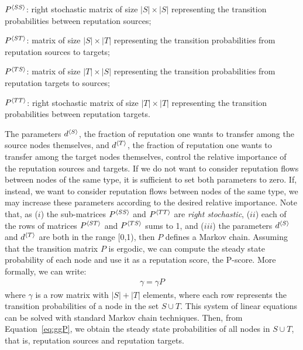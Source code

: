 \documentclass[notitlepage]{svjour3}
\begin{document}
\begin{description}
\item $P{^{\langle SS \rangle}}$: right stochastic matrix of size $|S|\times |S|$ representing the 
transition probabilities between reputation sources;
\item $P{^{\langle ST \rangle}}$: matrix of size $|S|\times |T|$ representing the transition probabilities from reputation sources to targets;
\item $P{^{\langle TS \rangle}}$: matrix of size $|T|\times |S|$ representing the transition probabilities from reputation targets to sources;
\item $P{^{\langle TT \rangle}}$: right stochastic matrix of size $|T|\times |T|$ representing the transition probabilities between reputation targets.
\end{description}

The parameters $d{^{\langle S \rangle}}$, the fraction of reputation one wants to transfer among the source nodes themselves, 
and $d{^{\langle T \rangle}}$, the fraction of reputation one wants to transfer among the target nodes themselves,
control the relative importance of the reputation sources and targets. 
If we do not want to consider reputation flows between nodes of the same type, it is sufficient to set both parameters to zero. If, instead, we want to consider reputation flows between nodes of the same type, we may increase these parameters according to the desired relative importance. Note that, as ($i$) the sub-matrices $P{^{\langle SS \rangle}}$ and $P{^{\langle TT \rangle}}$ are \emph{right stochastic}, ($ii$) each of the rows of matrices $P{^{\langle ST \rangle}}$ and $P{^{\langle TS \rangle}}$ sums to 1, and ($iii$) the parameters $d{^{\langle S \rangle}}$ and $d{^{\langle T \rangle}}$ are both in the range [0,1), then $P$ defines a Markov chain. Assuming that the transition matrix $P$ is ergodic, we can compute the steady state probability of each node 
and use it as a reputation score, the P-score. 
More formally, we can write: 
\begin{align}
\label{eq:ggP}
\gamma = \gamma P
\end{align}
where $\gamma$ is a row matrix with $|S|+|T|$ elements, 
where each row represents the transition probabilities of a node in the set $S\cup T$. 
%
This system of linear equations can be solved with standard Markov chain techniques. %
Then, from Equation~\eqref{eq:ggP}, we obtain the steady state probabilities of all nodes in $S \cup T$, that is, reputation sources and reputation targets.
\end{document}
